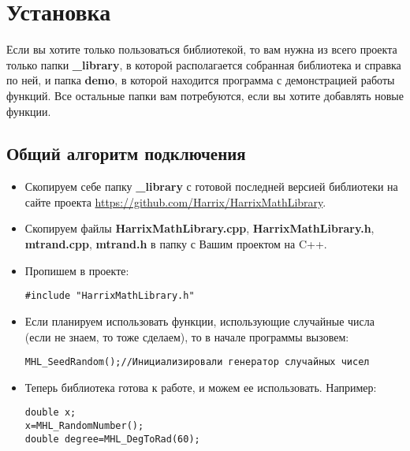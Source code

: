 \newpage
\section{Установка}\label{section_install}

Если вы хотите только пользоваться библиотекой, то вам нужна из всего проекта только папки \textbf{\_library}, в которой располагается собранная библиотека и справка по ней, и папка \textbf{demo}, в которой находится программа с демонстрацией работы функций. Все остальные папки вам потребуются, если вы хотите добавлять новые функции.

\subsection{Общий алгоритм подключения}

\begin{itemize}
\item Скопируем себе папку \textbf{\_library} с готовой последней версией библиотеки на сайте проекта \href{https://github.com/Harrix/HarrixMathLibrary}{https://github.com/Harrix/HarrixMathLibrary}.

\item Скопируем файлы \textbf{HarrixMathLibrary.cpp}, \textbf{HarrixMathLibrary.h}, \textbf{mtrand.cpp}, \textbf{mtrand.h} в папку с Вашим проектом на C++.

\item Пропишем в проекте:
\begin{lstlisting}[label=install_01,caption=Подключение библиотеки]
#include "HarrixMathLibrary.h"
\end{lstlisting}

\item Если планируем использовать функции, использующие случайные числа (если не знаем, то тоже сделаем), то в начале программы вызовем:
\begin{lstlisting}[label=install_02,caption=Инициализация генератора случайных чисел]
MHL_SeedRandom();//Инициализировали генератор случайных чисел
\end{lstlisting}

\item Теперь библиотека готова к работе, и можем ее использовать. Например:
\begin{lstlisting}[label=install_03,caption=Пример использования]
double x;
x=MHL_RandomNumber();
double degree=MHL_DegToRad(60);
\end{lstlisting}
\end{itemize}


